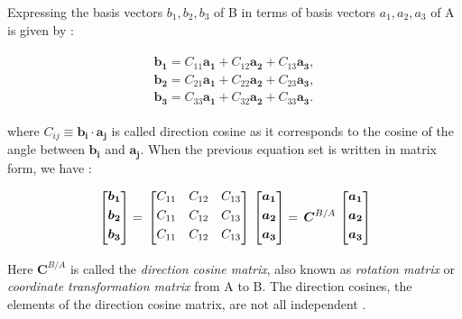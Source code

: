 Expressing the basis vectors $b_1, b_2, b_3$ of B in terms of basis vectors $a_1, a_2, a_3$ of A is given by :

\begin{align}
\label{eqn:C_B_A}
\begin{split}
\bm{b_1} = C_{11}\bm{a_1} + C_{12}\bm{a_2} + C_{13}\bm{a_3}  ,
\\
\bm{b_2} = C_{21}\bm{a_1} + C_{22}\bm{a_2} + C_{23}\bm{a_3}  ,
\\
\bm{b_3} = C_{33}\bm{a_1} + C_{32}\bm{a_2} + C_{33}\bm{a_3}  .
\end{split}
\end{align}

where $C_{ij} \equiv {\bm{b_i} \cdot \bm{a_j}} $  is called direction cosine as it corresponds to the cosine of the angle between  $\bm{b_i}$ and $\bm{a_j}$. 
When the previous equation set is written in matrix form, we have :

\begin{equation}{\label{eqn:C_B_Amatrix}}
\begin{bmatrix}
\bm{b_1}\\[0.3em]
\bm{b_2}\\[0.3em]
\bm{b_3}\\[0.3em]
\end{bmatrix}
=\,
\begin{bmatrix}
C_{11} & C_{12} & C_{13}\\[0.3em]
C_{11} & C_{12} & C_{13}\\[0.3em]
C_{11} & C_{12} & C_{13}\\[0.3em]
\end{bmatrix}
\,
\begin{bmatrix}
\bm{a_1}\\[0.3em]
\bm{a_2}\\[0.3em]
\bm{a_3}\\[0.3em]
\end{bmatrix}
=\,
\bm{C}^{B/A}
\,
\begin{bmatrix}
\bm{a_1}\\[0.3em]
\bm{a_2}\\[0.3em]
\bm{a_3}\\[0.3em]
\end{bmatrix}
\end{equation} 

Here $\bm{C}^{B/A}$ is called the \emph{direction cosine matrix}, also known as \emph{rotation matrix} or \emph{coordinate transformation matrix} from A to B\cite{wie2008space}.  
The direction cosines, the elements of the direction cosine matrix, are not all independent  \cite{wertz1978spacecraftAttitude}.

